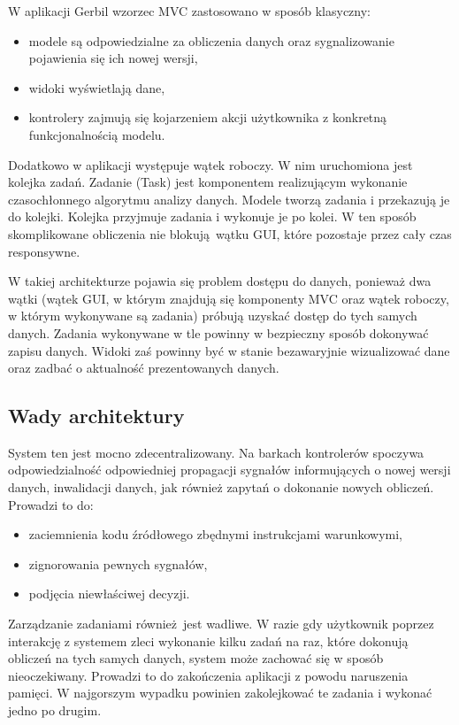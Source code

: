W aplikacji Gerbil wzorzec MVC zastosowano w sposób klasyczny: 
\begin{itemize}
	\item modele są odpowiedzialne za obliczenia danych oraz sygnalizowanie pojawienia się ich nowej wersji,
	\item widoki wyświetlają dane,
	\item kontrolery zajmują się kojarzeniem akcji użytkownika z konkretną funkcjonalnością modelu.
\end{itemize}

Dodatkowo w aplikacji występuje wątek roboczy. W nim uruchomiona jest kolejka zadań. Zadanie (Task) jest komponentem realizującym wykonanie czasochłonnego algorytmu analizy danych. Modele tworzą zadania i przekazują je do kolejki. Kolejka przyjmuje zadania i wykonuje je po kolei. W ten sposób skomplikowane obliczenia nie blokują wątku GUI, które pozostaje przez cały czas responsywne.

W takiej architekturze pojawia się problem dostępu do danych, ponieważ dwa wątki (wątek GUI, w którym znajdują się komponenty MVC oraz wątek roboczy, w którym wykonywane są zadania) próbują uzyskać dostęp do tych samych danych. Zadania wykonywane w tle powinny w bezpieczny sposób dokonywać zapisu danych. Widoki zaś powinny być w stanie bezawaryjnie wizualizować dane oraz zadbać o aktualność prezentowanych danych.

\subsection{Wady architektury}

System ten jest mocno zdecentralizowany. Na barkach kontrolerów spoczywa odpowiedzialność odpowiedniej propagacji sygnałów informujących o nowej wersji danych, inwalidacji danych, jak również zapytań o dokonanie nowych obliczeń. Prowadzi to do:
\begin{itemize}
	\item zaciemnienia kodu źródłowego zbędnymi instrukcjami warunkowymi,
	\item zignorowania pewnych sygnałów,
	\item podjęcia niewłaściwej decyzji.
\end{itemize}

Zarządzanie zadaniami również jest wadliwe. W razie gdy użytkownik poprzez interakcję z systemem zleci wykonanie kilku zadań na raz, które dokonują obliczeń na tych samych danych, system może zachować się w sposób nieoczekiwany. Prowadzi to do zakończenia aplikacji z powodu naruszenia pamięci. W najgorszym wypadku powinien zakolejkować te zadania i wykonać jedno po drugim.

